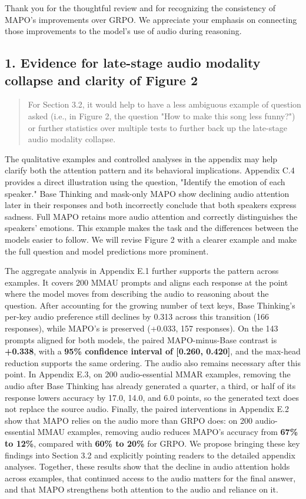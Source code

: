 Thank you for the thoughtful review and for recognizing the consistency of MAPO's improvements over GRPO. We appreciate your emphasis on connecting those improvements to the model's use of audio during reasoning.

\subsection*{1. Evidence for late-stage audio modality collapse and clarity of Figure 2}

\begin{quote}\small\color{ReviewQuote}
For Section 3.2, it would help to have a less ambiguous example of question asked (i.e., in Figure 2, the question "How to make this song less funny?") or further statistics over multiple tests to further back up the late-stage audio modality collapse.

\end{quote}

The qualitative examples and controlled analyses in the appendix may help clarify both the attention pattern and its behavioral implications. Appendix C.4 provides a direct illustration using the question, "Identify the emotion of each speaker." Base Thinking and mask-only MAPO show declining audio attention later in their responses and both incorrectly conclude that both speakers express sadness. Full MAPO retains more audio attention and correctly distinguishes the speakers' emotions. This example makes the task and the differences between the models easier to follow. We will revise Figure 2 with a clearer example and make the full question and model predictions more prominent.

The aggregate analysis in Appendix E.1 further supports the pattern across examples. It covers 200 MMAU prompts and aligns each response at the point where the model moves from describing the audio to reasoning about the question. After accounting for the growing number of text keys, Base Thinking's per-key audio preference still declines by 0.313 across this transition (166 responses), while MAPO's is preserved (+0.033, 157 responses). On the 143 prompts aligned for both models, the paired MAPO-minus-Base contrast is \textbf{+0.338}, with a \textbf{95\% confidence interval of [0.260, 0.420]}, and the max-head reduction supports the same ordering. The audio also remains necessary after this point. In Appendix E.3, on 200 audio-essential MMAR examples, removing the audio after Base Thinking has already generated a quarter, a third, or half of its response lowers accuracy by 17.0, 14.0, and 6.0 points, so the generated text does not replace the source audio. Finally, the paired interventions in Appendix E.2 show that MAPO relies on the audio more than GRPO does: on 200 audio-essential MMAU examples, removing audio reduces MAPO's accuracy from \textbf{67\% to 12\%}, compared with \textbf{60\% to 20\%} for GRPO. We propose bringing these key findings into Section 3.2 and explicitly pointing readers to the detailed appendix analyses. Together, these results show that the decline in audio attention holds across examples, that continued access to the audio matters for the final answer, and that MAPO strengthens both attention to the audio and reliance on it.

